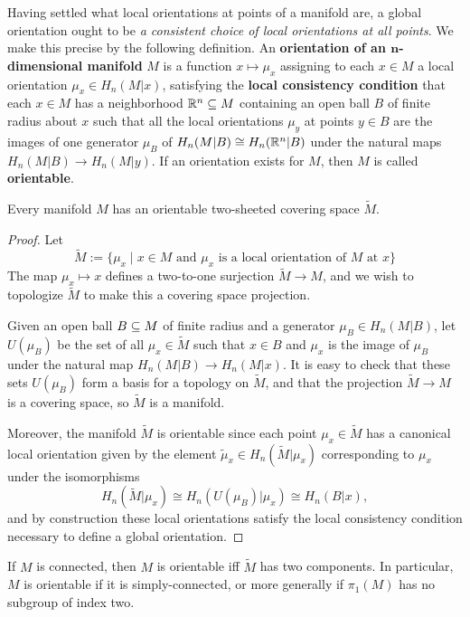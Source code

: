 Having settled what local orientations at points of a manifold are, a global orientation ought to be \textit{a consistent choice of local orientations at all points}. We make this precise by the following definition. An \textbf{orientation of an $\bm{n}$-dimensional manifold} $M$ is a function $x\mapsto\mu_x$ assigning to each $x\in M$ a local orientation $\mu_x\in H_n(M|x)$, satisfying the \textbf{local consistency condition} that each $x\in M$ has a neighborhood $\mathbb{R}^n\subseteq M$ containing an open ball $B$ of finite radius about $x$ such that all the local orientations $\mu_y$ at points $y\in B$ are the images of one generator $\mu_B$ of $H_n(M|B)\cong H_n(\mathbb{R}^n|B)$ under the natural maps $H_n(M|B)\to H_n(M|y)$. If an orientation exists for $M$, then $M$ is called \textbf{orientable}.
\begin{theorem}
Every manifold $M$ has an orientable two-sheeted covering space $\widetilde{M}$.
\end{theorem}
\begin{proof}
Let
\[\widetilde{M}:=\{\mu_x\mid x\in M\text{ and $\mu_x$ is a local orientation of $M$ at $x$}\}\]
The map $\mu_x\mapsto x$ defines a two-to-one surjection $\widetilde{M}\to M$, and we wish to topologize $\widetilde{M}$ to make this a covering space projection.\par
Given an open ball $B\subseteq M$ of finite radius and a generator $\mu_B\in H_n(M|B)$, let $U(\mu_B)$ be the set of all $\mu_x\in\widetilde{M}$ such that $x\in B$ and $\mu_x$ is the image of $\mu_B$ under the natural map $H_n(M|B)\to H_n(M|x)$. It is easy to check that these sets $U(\mu_B)$ form a basis for a topology on $\widetilde{M}$, and that the projection $\widetilde{M}\to M$ is a covering space, so $\widetilde{M}$ is a manifold.\par 
Moreover, the manifold $\widetilde{M}$ is orientable since each point $\mu_x\in\widetilde{M}$ has a canonical local orientation given by the element $\widetilde{\mu}_x\in H_n(\widetilde{M}|\mu_x)$ corresponding to $\mu_x$ under the isomorphisms
\[H_n(\widetilde{M}|\mu_x)\cong H_n(U(\mu_B)|\mu_x)\cong H_n(B|x),\]
and by construction these local orientations satisfy the local consistency condition necessary to define a global orientation.
\end{proof}
\begin{proposition}
If $M$ is connected, then $M$ is orientable iff $\widetilde{M}$ has two components. In particular, $M$ is orientable if it is simply-connected, or more generally if $\pi_1(M)$ has no subgroup of index two.
\end{proposition}

